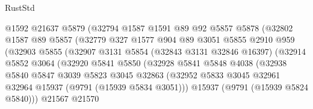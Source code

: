 \begin{lexlean}{RustStd}
\begin{coremodule}
                            @1592
                            @21637
                            @5879
                            (@32794
                              @1587
                              @1591
                              @89
                              @92
                              @5857
                              @5878
                              (@32802
                                @1587
                                @89
                                @5857
                                (@32779
                                  @327
                                  @1577
                                  @904
                                  @89
                                  @3051
                                  @5855
                                  @2910
                                  @959
                                  (@32903
                                    @5855
                                    (@32907
                                      @3131
                                      @5854
                                      (@32843 @3131 @32846 @16397)
                                      (@32914
                                        @5852
                                        @3064
                                        (@32920
                                          @5841
                                          @5850
                                          (@32928
                                            @5841
                                            @5848
                                            @4038
                                            (@32938
                                              @5840
                                              @5847
                                              @3039
                                              @5823
                                              @3045
                                              @32863
                                              (@32952
                                                @5833
                                                @3045
                                                @32961
                                                @32964
                                                @15937
                                                (@9791 (@15939 @5834 @3051)))
                                              @15937
                                              (@9791 (@15939 @5824 @5840)))
                                            @21567
                                            @21570

\end{coremodule}
\end{lexlean}
